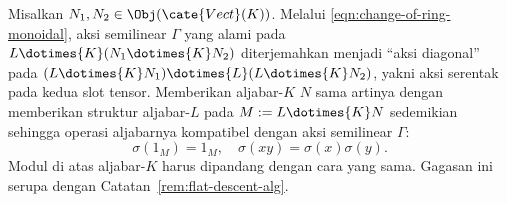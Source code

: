 \begin{remark}\label{rem:Galois-descent-alg}
	Misalkan $N_1,N_2\in\Obj(\cate{Vect}(K))$. Melalui
	\eqref{eqn:change-of-ring-monoidal}, aksi semilinear $\Gamma$ yang alami
	pada $L\dotimes{K}(N_1\dotimes{K}N_2)$ diterjemahkan menjadi
	``aksi diagonal'' pada
	$(L\dotimes{K}N_1)\dotimes{L}(L\dotimes{K}N_2)$, yakni aksi serentak pada
	kedua slot tensor. Memberikan aljabar-$K$ $N$ sama artinya dengan
	memberikan struktur aljabar-$L$ pada $M:=L\dotimes{K}N$ sedemikian sehingga
	operasi aljabarnya kompatibel dengan aksi semilinear $\Gamma$:
	\[ \sigma(1_M) = 1_M , \quad \sigma (xy) = \sigma(x) \sigma(y). \]
	Modul di atas aljabar-$K$ harus dipandang dengan cara yang sama. Gagasan
	ini serupa dengan Catatan~\ref{rem:flat-descent-alg}.
\end{remark}
